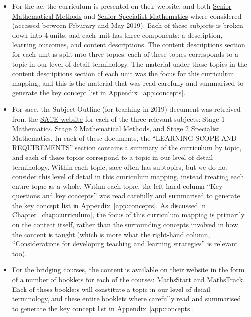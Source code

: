 \documentclass[twoside,12pt,a4paper]{report}
\newcommand{\refchap}[1]{\hyperref[chap:#1]{Chapter~\ref{chap:#1}}}
\newcommand{\refapp}[1]{\hyperref[app:#1]{Appendix~\ref{app:#1}}}
\begin{document}
\begin{itemize}
	\item For the \gls{ac}, the curriculum is presented on their website, and both \href{https://www.australiancurriculum.edu.au/senior-secondary-curriculum/mathematics/mathematical-methods/}{Senior Mathematical Methods} and \href{https://www.australiancurriculum.edu.au/senior-secondary-curriculum/mathematics/specialist-mathematics/}{Senior Specialist Mathematics} where considered (accessed between Feburary and May 2019). Each of these subjects is broken down into 4 units, and each unit has three components: a description, learning outcomes, and content descriptions. The content descriptions section for each unit is split into three topics, each of these topics corresponds to a topic in our level of detail terminology. The material under these topics in the content descriptions section of each unit was the focus for this curriculum mapping, and this is the material that was read carefully and summarised to generate the key concept list in \refapp{concepts}.
	\item For \gls{sace}, the Subject Outline (for teaching in 2019) document was retreived from the \href{https://www.sace.sa.edu.au/}{SACE website} for each of the three relevant subjects: Stage 1 Mathematics, Stage 2 Mathematical Methods, and Stage 2 Specialist Mathematics. In each of these documents, the ``LEARNING SCOPE AND REQUIREMENTS'' section contains a summary of the curriculum by topic, and each of these topics correspond to a topic in our level of detail terminology. Within each topic, \gls{sace} often has subtopics, but we do not consider this level of detail in this curriculum mapping, instead treating each entire topic as a whole. Within each topic, the left-hand column ``Key questions and key concepts'' was read carefully and summarised to generate the key concept list in \refapp{concepts}. As discussed in \refchap{curriculum}, the focus of this curriculum mapping is primarily on the content itself, rather than the surrounding concepts involved in how the content is taught (which is more what the right-hand column, ``Considerations for developing teaching and learning strategies'' is relevant too). 
	\item For the bridging courses, the content is available on \href{https://www.adelaide.edu.au/mathslearning/bridging/}{their website} in the form of a number of booklets for each of the courses: MathsStart and MathsTrack. Each of these booklets will constitute a topic in our level of detail terminology, and these entire booklets where carefully read and summarised to generate the key concept list in \refapp{concepts}.
\end{itemize}
\end{document}
